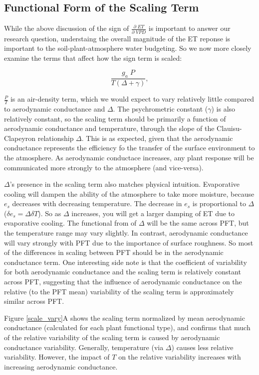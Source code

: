 \documentclass[draft,linenumbers]{agujournal}
\begin{document}
\subsection{Functional Form of the Scaling Term}

While the above discussion of the sign of $\frac{\partial \; ET}{\partial \; VPD}$ is important to answer our research question, understaing the overall magnitude of the ET reponse is important to the soil-plant-atmosphere water budgeting. So we now more closely examine the terms that affect how the sign term is scaled:

\begin{equation}
  \frac{g_a \; P}{T(\Delta + \gamma)},
\end{equation}

$\frac{P}{T}$ is an air-density term, which we would expect to vary relatively little compared to aerodynamic conductance and $\Delta$. The psychrometric constant ($\gamma$) is also relatively constant, so the scaling term should be primarily a function of aerodynamic conductance and temperature, through the slope of the Clauisu-Clapeyron relationship $\Delta$. This is as expected, given that the aerodynamic conductance represents the efficiency fo the transfer of the surface environment to the atmosphere. As aerodynamic conductace  increases, any plant response will be communicated more strongly to the atmosphere (and vice-versa).

$\Delta$'s presence in the scaling term also matches physical intuition. Evaporative cooling will dampen the ability of the atmosphere to take more moisture, because $e_{s}$ decreases with decreasing temperature. The decrease in $e_{s}$ is proportional to $\Delta$ ($\delta e_{s} = \Delta \delta T$). So as $\Delta$ increases, you will get a larger damping of ET due to evaporative cooling.  The functional from of $\Delta$ will be the same across PFT, but the temperature range may vary slightly. In contrast, aerodynamic conductance will vary strongly with PFT due to the importance of surface roughness. So most of the differences in scaling between PFT should be in the aerodynamic conductance term. One interesting side note is that the coefficient of variability for both aerodynamic conductance and the scaling term is relatively constant across PFT, suggesting that the influence of aerodynamic conductance on the relative (to the PFT mean) variability of the scaling term is approximately similar across PFT.

Figure \ref{scale_vary}A shows the scaling term normalized by mean aerodynamic conductance (calculated for each plant functional type), and confirms that much of the relative variability of the scaling term is caused by aerodynamic conductance variability. Generally, temperature (via $\Delta$) causes less relative variability. However, the impact of $T$ on the relative variability increases with increasing aerodynamic conductance. 
\end{document}
